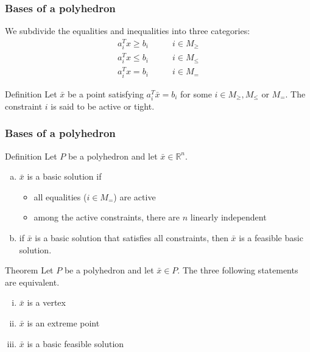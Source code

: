 \documentclass[9pt,handout]{beamer}
\newcommand{\R}       {\mathbb{R} }
\begin{document}
\begin{frame}
\frametitle{Bases of a polyhedron}
We subdivide the equalities and inequalities into three categories:
\begin{align*}
a_i^T x \geq b_i \qquad & i\in M_{\geq}\\
a_i^T x \leq b_i \qquad& i \in M_{\leq}\\
a_i^T x = b_i \qquad& i \in M_{=}
\end{align*}
\begin{block}{Definition}
Let  $\bar x$ be a point satisfying  $a_i^T \bar x = b_i$ for some  $i\in M_{\geq}, M_{\leq}$ or
$M_=$. The constraint $i$ is said to be \alert{active} or \alert{tight}.
\end{block}
\end{frame}
\begin{frame}
\frametitle{Bases of a polyhedron}
\begin{block}{Definition}
Let  $P$ be a polyhedron and let $\bar x \in \R^n.$
\begin{enumerate}[(a)]
\item<1-> $\bar x$ is a \alert{basic solution} if 
\begin{itemize}
\item<1-> all equalities ($i\in M_=$) are \alert{active}
\item<1-> among the active constraints, there are \alert{$n$ linearly 
independent} 
\end{itemize}
\item<1-> if $\bar x$ is a basic solution  \alert{that satisfies all constraints}, then
$\bar x$ is a \alert{feasible basic solution}.
\end{enumerate}
\end{block}
\begin{block}{Theorem}
Let  $P$ be a polyhedron and let  $\bar x \in P$. The three following statements are
equivalent.
\begin{enumerate}[(i)]
\item<2-> $\bar x$ is a \alert{vertex}
\item<2-> $\bar x$ is an \alert{extreme point}
\item<2-> $\bar x$ is a \alert{basic feasible solution}
\end{enumerate}
\end{block}
\end{frame}
\end{document}
